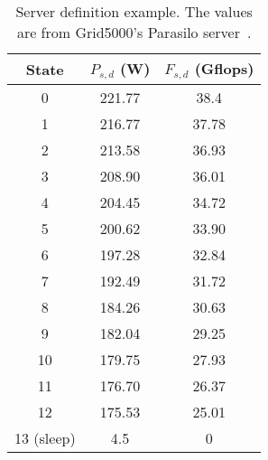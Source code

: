 \begin{table}[!htb]
\centering
\caption{Server definition example. The values are from Grid5000's Parasilo server~\cite{dacosta:hal-03453537v1, dacostakeynote}.}
\label{tab:servers}
\begin{tabular}{c|c|c}
    \hline
    State         & \(P_{s,d}\) (W) & \(F_{s,d}\) (Gflops) \\ \hline\hline
    0                       & 221.77                   & 38.4                          \\
    1                       & 216.77                   & 37.78                         \\
    2                       & 213.58                   & 36.93                         \\
    3                       & 208.90                   & 36.01                         \\
    4                       & 204.45                   & 34.72                         \\
    5                       & 200.62                   & 33.90                         \\
    6                       & 197.28                   & 32.84                         \\
    7                       & 192.49                   & 31.72                         \\
    8                       & 184.26                   & 30.63                         \\
    9                       & 182.04                   & 29.25                         \\
    10                      & 179.75                   & 27.93                         \\
    11                      & 176.70                   & 26.37                         \\
    12                      & 175.53                   & 25.01                         \\
    13 (sleep)              & 4.5                      & 0                             \\ \hline
\end{tabular}
\end{table}
